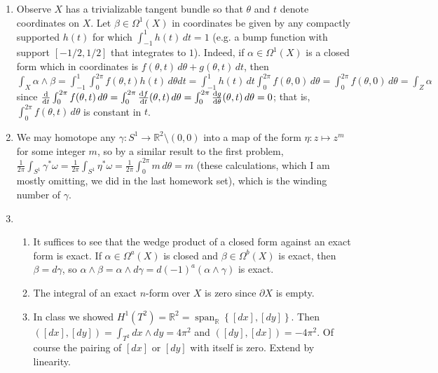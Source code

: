 \documentclass[11pt,leqno]{article}
\theoremstyle{plain}
\theoremstyle{definition}
\numberwithin{equation}{section}
\numberwithin{lem}{section}
\newcommand{\cbr}[1]{\left\{#1\right\}}
\DeclareMathOperator{\Span}{span}
\begin{document}
\begin{enumerate}
\begin{enumerate}
    \end{enumerate}
    \item Observe $X$ has a trivializable tangent bundle so that $\theta$ and $t$ denote coordinates on $X$. Let $\beta\in \Omega^1(X)$ in coordinates be given by any compactly supported $h(t)$ for which $\int_{-1}^1 h(t)\,dt = 1$ (e.g. a bump function with support $[-1/2,1/2]$ that integrates to $1$). Indeed, if $\alpha\in \Omega^1(X)$ is a closed form which in coordinates is $f(\theta,t)\,d\theta + g(\theta,t)\,dt$, then $\int_X\alpha\wedge \beta = \int_{-1}^1\int_0^{2\pi}f(\theta,t)h(t)\,d\theta dt = \int_{-1}^1h(t)\,dt\int_0^{2\pi}f(\theta,0)\,d\theta = \int_0^{2\pi}f(\theta,0)\,d\theta = \int_Z\alpha$ since $\dv{t}\int_0^{2\pi}f(\theta,t)\,d\theta = \int_0^{2\pi}\dv{f}{t}\/(\theta,t)\,d\theta = \int_0^{2\pi}\dv{g}{\theta}\/(\theta,t)\,d\theta = 0$; that is, $\int_0^{2\pi}f(\theta,t)\,d\theta$ is constant in $t$.
    \item We may homotope any $\gamma\colon S^1\to\mathbb R^2\setminus{(0,0)}$ into a map of the form $\eta \colon z\mapsto z^m$ for some integer $m$, so by a similar result to the first problem, $\frac{1}{2\pi}\int_{S^1}\gamma^\ast\omega = \frac{1}{2\pi}\int_{S^1}\eta^\ast\omega = \frac{1}{2\pi}\int_0^{2\pi}m\,d\theta = m$ (these calculations, which I am mostly omitting, we did in the last homework set), which is the winding number of $\gamma$.
    \item \begin{enumerate}
        \item It suffices to see that the wedge product of a closed form against an exact form is exact. If $\alpha\in \Omega^a(X)$ is closed and $\beta\in\Omega^b(X)$ is exact, then $\beta = d\gamma$, so $\alpha\wedge \beta = \alpha\wedge d\gamma = d(-1)^a(\alpha\wedge \gamma)$ is exact.
        \item The integral of an exact $n$-form over $X$ is zero since $\partial X$ is empty.
        \item In class we showed $H^1(T^2) = \mathbb R^2 = \Span_{\mathbb R}\cbr{[dx],[dy]}$. Then $([dx],[dy]) = \int_{T^2}dx\wedge dy = 4\pi^2$ and $([dy],[dx]) = -4\pi^2$. Of course the pairing of $[dx]$ or $[dy]$ with itself is zero. Extend by linearity.
    \end{enumerate}
\end{enumerate}
\end{document}
